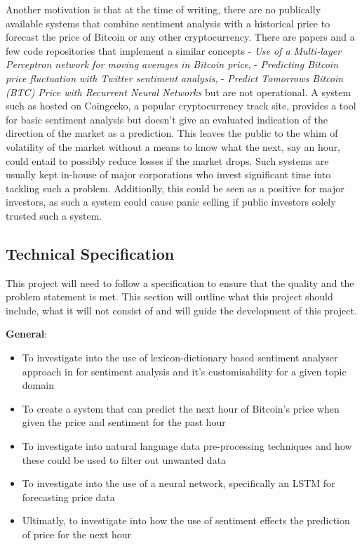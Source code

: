 \documentclass[oneside, 12pt]{article}
\begin{document}
		Another motivation is that at the time of writing, there are no publically available systems that combine sentiment analysis with a historical price to forecast the price of Bitcoin or any other cryptocurrency. There are papers and a few code repositories that implement a similar concepts \cite{nlAeiBTCPSO} - \textit{Use of a Multi-layer Perceptron network for moving averages in Bitcoin price}, \cite{BTCFTsent} - \textit{Predicting Bitcoin price fluctuation with Twitter sentiment analysis}, \cite{BTCRNN} - \textit{Predict Tomorrows Bitcoin (BTC) Price with Recurrent Neural Networks} but are not operational. A system such as \cite{SaTdpsmm} hosted on Coingecko, a popular cryptocurrency track site, provides a tool for basic sentiment analysis but doesn't give an evaluated indication of the direction of the market as a prediction. This leaves the public to the whim of volatility of the market without a means to know what the next, say an hour, could entail to possibly reduce losses if the market drops. Such systems are usually kept in-house of major corporations who invest significant time into tackling such a problem. Additionlly, this could be seen as a positive for major investors, as such a system could cause panic selling if public investors solely trusted such a system.
			
		\newpage
		\subsection{Technical Specification}
		This project will need to follow a specification to ensure that the quality and the problem statement is met. This section will outline what this project should include, what it will not consist of and will guide the development of this project.
		\newline
		
		\textbf{General}:
		\begin{itemize}
			\item To investigate into the use of lexicon-dictionary based sentiment analyser approach in for sentiment analysis and it's customisability for a given topic domain
			\item To create a system that can predict the next hour of Bitcoin's price when given the price and sentiment for the past hour
			\item To investigate into natural language data pre-processing techniques and how these could be used to filter out unwanted data
			\item To investigate into the use of a neural network, specifically an LSTM for forecasting price data
			\item Ultimatly, to investigate into how the use of sentiment effects the prediction of price for the next hour
			\newline
		\end{itemize}
		
\end{document}
